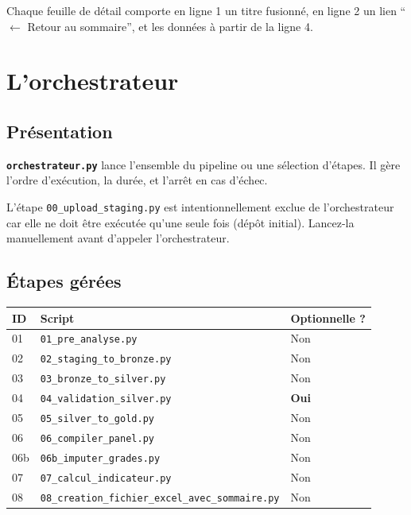 \documentclass[12pt,a4paper,french]{report}
\newcommand{\scriptname}[1]{\texttt{\textbf{#1}}}
\begin{document}
Chaque feuille de détail comporte en ligne 1 un titre fusionné, en ligne 2
un lien ``$\leftarrow$ Retour au sommaire'', et les données à partir de la
ligne 4.

\chapter{L'orchestrateur}

\section{Présentation}

\scriptname{orchestrateur.py} lance l'ensemble du pipeline ou une sélection
d'étapes. Il gère l'ordre d'exécution, la durée, et l'arrêt en cas d'échec.

\begin{warningbox}
  L'étape \texttt{00\_upload\_staging.py} est intentionnellement exclue de
  l'orchestrateur car elle ne doit être exécutée qu'une seule fois
  (dépôt initial). Lancez-la manuellement avant d'appeler l'orchestrateur.
\end{warningbox}

\section{Étapes gérées}

\begin{tabularx}{\textwidth}{llX}
  \toprule
  \textbf{ID} & \textbf{Script} & \textbf{Optionnelle ?} \\
  \midrule
  01 & \texttt{01\_pre\_analyse.py} & Non \\
  02 & \texttt{02\_staging\_to\_bronze.py} & Non \\
  03 & \texttt{03\_bronze\_to\_silver.py} & Non \\
  04 & \texttt{04\_validation\_silver.py} & \textbf{Oui} \\
  05 & \texttt{05\_silver\_to\_gold.py} & Non \\
  06 & \texttt{06\_compiler\_panel.py} & Non \\
  06b & \texttt{06b\_imputer\_grades.py} & Non \\
  07 & \texttt{07\_calcul\_indicateur.py} & Non \\
  08 & \texttt{08\_creation\_fichier\_excel\_avec\_sommaire.py} & Non \\
  \bottomrule
\end{tabularx}
\end{document}
